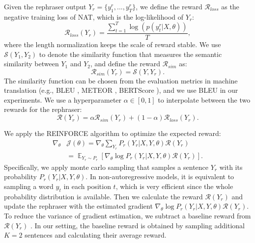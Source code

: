 \documentclass[letterpaper]{article} %
\begin{document}
Given the rephraser output $Y_r=\{y_1^r,...,y_T^r\}$, we define the reward $\mathcal{R}_{loss}$ as the negative training loss of NAT, which is the log-likelihood of $Y_r$:
\begin{equation}
\mathcal{R}_{loss}(Y_r) = \frac{\sum_{t=1}^{T}\log(p(y_t^r|X,\theta))}{T},
\end{equation}
where the length normalization keeps the scale of reward stable. We use $\mathcal{S}(Y_1,Y_2)$ to denote the similarity function that measures the semantic similarity between $Y_1$ and $Y_2$, and define the reward $\mathcal{R}_{sim}$ as:
\begin{equation}
\mathcal{R}_{sim}(Y_r) = \mathcal{S}(Y,Y_r).
\end{equation}
The similarity function can be chosen from the evaluation metrics in machine translation (e.g., BLEU \cite{papineni2002bleu}, METEOR \cite{banerjee-lavie-2005-meteor}, BERTScore \cite{zhang2019bertscore}), and we use BLEU in our experiments. We use a hyperparameter $\alpha \in [0,1]$ to interpolate between the two rewards for the rephraser:
\begin{equation}
\label{eq:rsim}
\mathcal{R}(Y_r) = \alpha \mathcal{R}_{sim}(Y_r)+(1-\alpha)\mathcal{R}_{loss}(Y_r).
\end{equation}

We apply the REINFORCE algorithm \cite{williams1992simple} to optimize the expected reward:
\begin{equation}
\begin{aligned}
\label{eq:rl}
\nabla_{\theta}&\mathcal{J}(\theta)=\nabla_{\theta}\sum_{Y_r}P_r(Y_r|X,Y,\theta)\mathcal{R}(Y_r)\\
&=\mathop{\mathbb{E}}_{Y_r \sim P_r}[\nabla_{\theta}\log P_r(Y_r|X,Y,\theta)\mathcal{R}(Y_r)].
\end{aligned}
\end{equation}
Specifically, we apply monte carlo sampling that samples a sentence $Y_r$ with its probability $P_r(Y_r|X,Y,\theta)$. In non-autoregressive models, it is equivalent to sampling a word $y_t$ in each position $t$, which is very efficient since the whole probability distribution is available. Then we calculate the reward $\mathcal{R}(Y_r)$ and update the rephraser with the estimated gradient $\nabla_{\theta}\log P_r(Y_r|X,Y,\theta)\mathcal{R}(Y_r)$. To reduce the variance of gradient estimation, we subtract a baseline reward from $\mathcal{R}(Y_r)$ \cite{10.5555/647235.720252}. In our setting, the baseline reward is obtained by sampling additional $K=2$ sentences and calculating their average reward.
\end{document}
